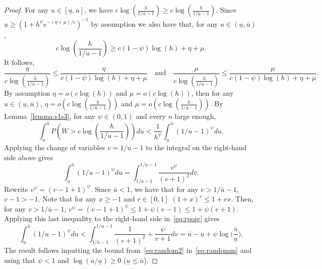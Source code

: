 \documentclass[
  12pt]{article}
\newtheorem{lem}[thm]{\textsc{Lemma}}
\begin{document}
\begin{proof}
For any $u\in [\underline{u},\bar{u}]$, we have $c\log \left(\frac{h}{1 / u-1}\right) \geq c\log \left(\frac{h}{1 / \underline{u}-1}\right)$. Since $\underline{u}\geq (1+h^{\psi}e^{-(\eta+\mu)/c})^{-1}$ by assumption  we also have that, for any $u\in (\underline{u},\bar{u})$,
$$c\log \left(\frac{h}{1 / u-1}\right) \geq c(1-\psi)\log(h)+\eta+\mu.$$
It follows,
$$\frac{\eta}{c\log \left(\frac{h}{1 / u-1}\right)}\leq \frac{\eta}{c(1-\psi)\log(h)+\eta+\mu}
\quad\text{and}\quad
\frac{\mu}{c\log \left(\frac{h}{1 / u-1}\right)}\leq\frac{\mu}{ c(1-\psi)\log(h)+\eta+\mu}.$$
By assumption $\eta=o\left(c\log (h)\right)$ and $\mu=o\left(c\log (h)\right)$, then for any $u\in (\underline{u},\bar{u})$, $\eta=o\left(c\log \left(\frac{h}{1 / u-1}\right)\right)$ and $\mu=o\left(c\log \left(\frac{h}{1 / u-1}\right)\right)$. By Lemma~\ref{lemma:s1s3}, for any $\psi\in(0,1)$ and every $n$ large enough,
\begin{equation}\label{eq:randomm}
    \int_{\underline{u}}^{\bar{u}} P\left(W>c\log \left(\frac{h}{1 / u-1}\right)\right) d u< \frac{1}{h^{\psi}} \int_{\underline{u}}^{\bar{u}}(1 / u-1)^{\psi} d u .
\end{equation}
Applying the change of variables $v=1 / u-1$ to the integral on the right-hand side above gives
\begin{equation}\label{eq:rpoig}
    \int_{\underline{u}}^{\bar{u}}(1 / u-1)^{\psi} d u=\int_{1 / \bar{u}-1}^{1 / \underline{u}-1} \frac{v^{\psi}}{(v+1)^2} d v.
\end{equation}
Rewrite $v^{\psi}=(v-1 + 1)^{\psi}$. Since $\bar{u}<1$, we have that for any $v>1 / \bar{u}-1$, $v-1>-1$. Note that for any $x \geq-1$ and $r\in[0,1]$ $(1+x)^r \leq 1+r x$. Then, for any $v>1 / \bar{u}-1$, $v^{\psi}=(v-1 + 1)^{\psi}\leq 1 + \psi (v-1)\leq 1 + \psi(v+1)$. Applying this last inequality to the right-hand side in~\eqref{eq:rpoig} gives
\begin{equation}\label{eq:random2}
\int_{\underline{u}}^{\bar{u}}(1 / u-1)^{\psi} d u<\int_{1 / \bar{u}-1}^{1 / \underline{u}-1} \frac{1}{(v+1)^2} +\frac{\psi}{v+1} d v = \bar{u}-\underline{u}+\psi\log\Big(\frac{\bar{u}}{\underline{u}}\Big).
\end{equation}
The result follows inputting the bound from~\eqref{eq:random2} in~\eqref{eq:randomm} and using that $\psi<1$ and $\log(\bar{u}/\underline{u}) \geq 0$ ($\underline{u} \leq \bar{u}$).
\end{proof}


\end{document}
